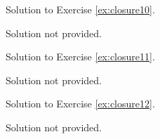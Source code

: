 Solution to Exercise \ref{ex:closure10}.


    Solution not provided.
    

\newpage

Solution to Exercise \ref{ex:closure11}.


    Solution not provided.
    

\newpage

Solution to Exercise \ref{ex:closure12}.


    Solution not provided.
    
